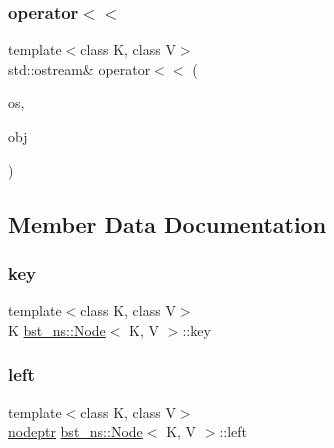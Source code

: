 \subsubsection{\texorpdfstring{operator$<$$<$}{operator<<}}
{\footnotesize\ttfamily template$<$class K, class V$>$ \\
std\+::ostream\& operator$<$$<$ (\begin{DoxyParamCaption}\item[{std\+::ostream \&}]{os,  }\item[{const \hyperlink{classbst__ns_1_1Node}{Node}$<$ K, V $>$ \&}]{obj }\end{DoxyParamCaption})\hspace{0.3cm}{\ttfamily [friend]}}



\subsection{Member Data Documentation}
\mbox{\label{classbst__ns_1_1Node_aab49c1b3b2ead5b79a4d259866c6570e}} 
\subsubsection{\texorpdfstring{key}{key}}
{\footnotesize\ttfamily template$<$class K, class V$>$ \\
K \hyperlink{classbst__ns_1_1Node}{bst\+\_\+ns\+::\+Node}$<$ K, V $>$\+::key}

\mbox{\label{classbst__ns_1_1Node_a5758be9af43bbba08e9ec0b53858dc2c}} 
\subsubsection{\texorpdfstring{left}{left}}
{\footnotesize\ttfamily template$<$class K, class V$>$ \\
\hyperlink{bst__rwlock__impl_8h_a04158d2a20768fe447133ff555823b05}{nodeptr} \hyperlink{classbst__ns_1_1Node}{bst\+\_\+ns\+::\+Node}$<$ K, V $>$\+::left}

\mbox{\label{classbst__ns_1_1Node_a9802ddeb9977786cba3938bf515f4214}} 
